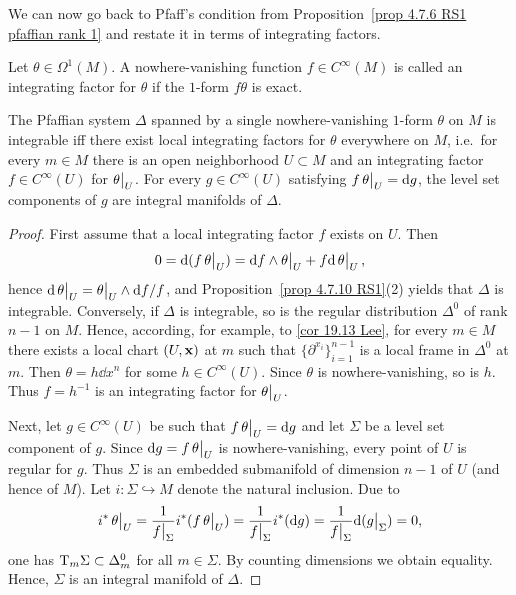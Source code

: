 We can now go back to Pfaff's condition from Proposition~\ref{prop 4.7.6 RS1 pfaffian rank 1} and restate it in terms of integrating factors.

\begin{defn}
    Let $\theta\in\Omega^1(M)$. A nowhere-vanishing function $f\in C^\infty(M)$ is called an integrating factor for $\theta$ if the $1$-form $f\theta$ is exact.
\end{defn}

\begin{prop}[{{\cite[Prop.~4.7.13]{RS1}}}]\label{prop 4.7.13 RS1}
    The Pfaffian system $\Delta$ spanned by a single nowhere-vanishing $1$-form $\theta$ on $M$ is integrable iff there exist local integrating factors for $\theta$ everywhere on $M$, i.e.~for every $m\in M$ there is an open neighborhood $U\subset M$ and an integrating factor $f\in C^\infty(U)$ for $\restr{\theta}{U}$. For every $g\in C^\infty(U)$ satisfying $f\restr{\theta}{U}=\dd g$, the level set components of $g$ are integral manifolds of $\Delta$.
\end{prop}
\begin{proof}
    First assume that a local integrating factor $f$ exists on $U$. Then 
    \[0=\dd(f\restr{\theta}{U})=\dd f\wedge\restr{\theta}{U}+f\dd\restr{\theta}{U},\]
    hence $\dd\restr{\theta}{U}=\restr{\theta}{U}\wedge \dd f/f$, and Proposition~\ref{prop 4.7.10 RS1}(2) yields that $\Delta$ is integrable. Conversely, if $\Delta$ is integrable, so is the regular distribution $\Delta^0$ of rank $n-1$ on $M$. Hence, according, for example, to \ref{cor 19.13 Lee}, for every $m\in M$ there exists a local chart $(U,\bf{x})$ at $m$ such that $\{\partial^{x_i}\}_{i=1}^{n-1}$ is a local frame in $\Delta^0$ at $m$. Then $\theta=h\dd x^n$ for some $h\in C^\infty(U)$. Since $\theta$ is nowhere-vanishing, so is $h$. Thus $f=h^{-1}$ is an integrating factor for $\restr{\theta}{U}$.

    Next, let $g\in C^\infty(U)$ be such that $f\restr{\theta}{U}=\dd g$ and let $\Sigma$ be a level set component of $g$. Since $\dd g=f\restr{\theta}{U}$ is nowhere-vanishing, every point of $U$ is regular for $g$. Thus $\Sigma$ is an embedded submanifold of dimension $n-1$ of $U$ (and hence of $M$). Let $i:\Sigma\hookrightarrow M$ denote the natural inclusion. Due to
    \[i^\ast\restr{\theta}{U}=\frac{1}{\restr{f}{\Sigma}}i^\ast(f\restr{\theta}{U})=\frac{1}{\restr{f}{\Sigma}}i^\ast(\dd g)=\frac{1}{\restr{f}{\Sigma}}\dd(\restr{g}{\Sigma})=0, \]
    one has $\T_m\Sigma\subset\Delta_m^0$ for all $m\in\Sigma$. By counting dimensions we obtain equality. Hence, $\Sigma$ is an integral manifold of $\Delta$.
\end{proof}


